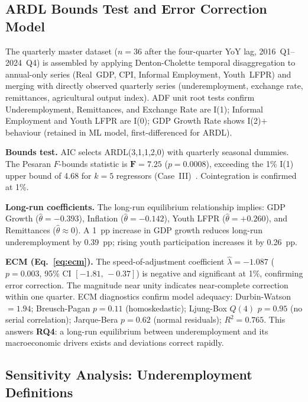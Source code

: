 \documentclass[sigconf]{acmart}
\begin{document}
\subsection{ARDL Bounds Test and Error Correction Model}
\label{sec:ardl}

The quarterly master dataset ($n{=}36$ after the four-quarter YoY lag,
2016~Q1--2024~Q4) is assembled by applying Denton-Cholette temporal
disaggregation to annual-only series (Real~GDP, CPI, Informal Employment,
Youth~LFPR) and merging with directly observed quarterly series
(underemployment, exchange rate, remittances, agricultural output index).
ADF unit root tests confirm Underemployment, Remittances, and Exchange Rate
are I(1); Informal Employment and Youth LFPR are I(0); GDP Growth Rate
shows I(2)$+$ behaviour (retained in ML model, first-differenced for ARDL).

\textbf{Bounds test.} AIC selects ARDL(3,1,1,2,0) with quarterly seasonal
dummies. The Pesaran $F$-bounds statistic is $\mathbf{F{=}7.25}$
($p{=}0.0008$), exceeding the 1\% I(1) upper bound of 4.68 for $k{=}5$
regressors (Case~III)~\cite{pesaran2001}. Cointegration is confirmed at 1\%.

\textbf{Long-run coefficients.} The long-run equilibrium relationship
implies: GDP Growth ($\hat\theta{=}{-}0.393$), Inflation
($\hat\theta{=}{-}0.142$), Youth LFPR ($\hat\theta{=}{+}0.260$), and
Remittances ($\hat\theta{\approx}0$). A 1~pp increase in GDP growth reduces
long-run underemployment by 0.39~pp; rising youth participation increases
it by 0.26~pp.

\textbf{ECM (Eq.~\ref{eq:ecm}).} The speed-of-adjustment coefficient
$\hat\lambda{=}{-}1.087$ ($p{=}0.003$, 95\% CI $[-1.81,\,-0.37]$) is
negative and significant at 1\%, confirming error correction. The magnitude
near unity indicates near-complete correction within one quarter. ECM
diagnostics confirm model adequacy: Durbin-Watson~$=1.94$; Breusch-Pagan
$p{=}0.11$ (homoskedastic); Ljung-Box $Q(4)$ $p{=}0.95$ (no serial
correlation); Jarque-Bera $p{=}0.62$ (normal residuals); $R^2{=}0.765$.
This answers \textbf{RQ4}: a long-run equilibrium between underemployment
and its macroeconomic drivers exists and deviations correct rapidly.

\subsection{Sensitivity Analysis: Underemployment Definitions}
\label{sec:sensitivity}
\end{document}
